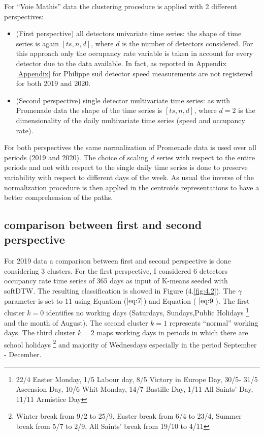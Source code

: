 \documentclass[11pt]{article}
\begin{document}
For ``Voie Mathis'' data the clustering procedure is applied with 2
different perspectives:

\begin{itemize}
\item
  (First perspective) all detectors univariate time series: the shape of
  time series is again \([ts,n,d]\), where \(d\) is the number of
  detectors considered. For this approach only the occupancy rate
  variable is taken in account for every detector due to the data
  available. In fact, as reported in Appendix \ref{Appendix} for
  Philippe sud detector speed measurements are not registered for both
  2019 and 2020.
\item
  (Second perspective) single detector multivariate time series: as with
  Promenade data the shape of the time series is \([ts,n,d]\), where
  \(d=2\) is the dimensionality of the daily multivariate time series
  (speed and occupancy rate).
\end{itemize}

For both perspectives the same normalization of Promenade data is used
over all periods (2019 and 2020). The choice of scaling \(d\) series
with respect to the entire periods and not with respect to the single
daily time series is done to preserve variability with respect to
different days of the week. As usual the inverse of the normalization
procedure is then applied in the centroids representations to have a
better comprehension of the paths.

    \subsection{comparison between first and second perspective}

    For 2019 data a comparison between first and second perspective is done
considering 3 clusters. For the first perspective, I considered 6
detectors occupancy rate time series of 365 days as input of K-means
seeded with softDTW. The resulting classification is showed in Figure
(4.\ref{fig:4.2}). The \(\gamma\) parameter is set to 11 using Equation
(\(\ref{eq:7}\)) and Equation ( \(\ref{eq:9}\)). The first cluster
\(k=0\) identifies no working days (Saturdays, Sundays,Public Holidays
\footnote{22/4 Easter Monday, 1/5 Labour day, 8/5 Victory in Europe Day, 30/5- 31/5 
Ascension Day, 10/6 Whit Monday, 14/7 Bastille Day, 1/11 All Saints' Day, 11/11 Armistice Day}
and the month of August). The second cluster \(k=1\) represents
``normal'' working days. The third cluster \(k=2\) maps working days in
periods in which there are school holidays
\footnote{Winter break from 9/2 to 25/9, Easter break from 6/4 to 23/4, Summer break from 5/7 to 2/9, All Saints' break from 19/10 to 4/11}
and majority of Wednesdays especially in the period September -
December.
\end{document}
